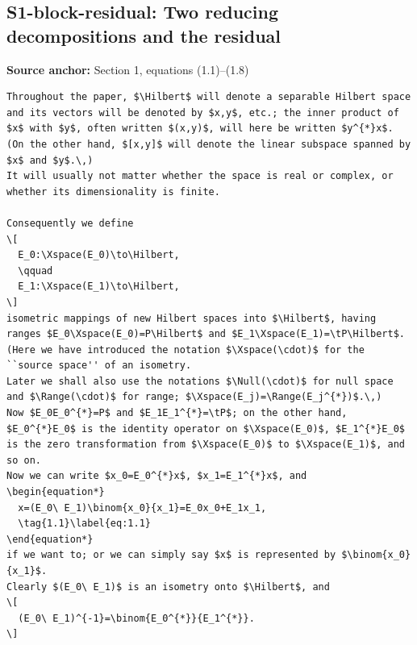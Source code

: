 \subsection*{S1-block-residual: Two reducing decompositions and the residual}
\noindent\textbf{Source anchor:} Section 1, equations (1.1)–(1.8)\\
\begin{verbatim}
Throughout the paper, $\Hilbert$ will denote a separable Hilbert space and its vectors will be denoted by $x,y$, etc.; the inner product of $x$ with $y$, often written $(x,y)$, will here be written $y^{*}x$.
(On the other hand, $[x,y]$ will denote the linear subspace spanned by $x$ and $y$.\,)
It will usually not matter whether the space is real or complex, or whether its dimensionality is finite.

Consequently we define
\[
  E_0:\Xspace(E_0)\to\Hilbert,
  \qquad
  E_1:\Xspace(E_1)\to\Hilbert,
\]
isometric mappings of new Hilbert spaces into $\Hilbert$, having ranges $E_0\Xspace(E_0)=P\Hilbert$ and $E_1\Xspace(E_1)=\tP\Hilbert$.
(Here we have introduced the notation $\Xspace(\cdot)$ for the ``source space'' of an isometry.
Later we shall also use the notations $\Null(\cdot)$ for null space and $\Range(\cdot)$ for range; $\Xspace(E_j)=\Range(E_j^{*})$.\,)
Now $E_0E_0^{*}=P$ and $E_1E_1^{*}=\tP$; on the other hand, $E_0^{*}E_0$ is the identity operator on $\Xspace(E_0)$, $E_1^{*}E_0$ is the zero transformation from $\Xspace(E_0)$ to $\Xspace(E_1)$, and so on.
Now we can write $x_0=E_0^{*}x$, $x_1=E_1^{*}x$, and
\begin{equation*}
  x=(E_0\ E_1)\binom{x_0}{x_1}=E_0x_0+E_1x_1,
  \tag{1.1}\label{eq:1.1}
\end{equation*}
if we want to; or we can simply say $x$ is represented by $\binom{x_0}{x_1}$.
Clearly $(E_0\ E_1)$ is an isometry onto $\Hilbert$, and
\[
  (E_0\ E_1)^{-1}=\binom{E_0^{*}}{E_1^{*}}.
\]


\end{verbatim}
